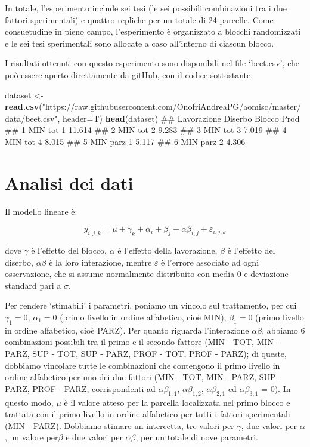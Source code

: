 \documentclass[a4paper,12pt,oneside]{book}
\newenvironment{Shaded}{\begin{snugshade}}{\end{snugshade}}
\newcommand{\KeywordTok}[1]{\textcolor[rgb]{0.13,0.29,0.53}{\textbf{#1}}}
\newcommand{\DataTypeTok}[1]{\textcolor[rgb]{0.13,0.29,0.53}{#1}}
\newcommand{\StringTok}[1]{\textcolor[rgb]{0.31,0.60,0.02}{#1}}
\newcommand{\NormalTok}[1]{#1}
\theoremstyle{definition}
\theoremstyle{definition}
\theoremstyle{definition}
\theoremstyle{remark}
\begin{document}
In totale, l'esperimento include sei tesi (le sei possibili combinazioni
tra i due fattori sperimentali) e quattro repliche per un totale di 24
parcelle. Come consuetudine in pieno campo, l'esperimento è organizzato
a blocchi randomizzati e le sei tesi sperimentali sono allocate a caso
all'interno di ciascun blocco.

I risultati ottenuti con questo esperimento sono disponibili nel file
`beet.csv', che può essere aperto direttamente da gitHub, con il codice
sottostante.

\begin{Shaded}
\begin{Highlighting}[]
\NormalTok{dataset <-}\StringTok{ }\KeywordTok{read.csv}\NormalTok{(}\StringTok{"https://raw.githubusercontent.com/OnofriAndreaPG/aomisc/master/data/beet.csv"}\NormalTok{, }\DataTypeTok{header=}\NormalTok{T)}
\KeywordTok{head}\NormalTok{(dataset)}
\NormalTok{##   Lavorazione Diserbo Blocco   Prod}
\NormalTok{## 1         MIN     tot      1 11.614}
\NormalTok{## 2         MIN     tot      2  9.283}
\NormalTok{## 3         MIN     tot      3  7.019}
\NormalTok{## 4         MIN     tot      4  8.015}
\NormalTok{## 5         MIN    parz      1  5.117}
\NormalTok{## 6         MIN    parz      2  4.306}
\end{Highlighting}
\end{Shaded}

\section{Analisi dei dati}\label{analisi-dei-dati-1}

Il modello lineare è:

\[y_{i,j,k} = \mu + \gamma_k + \alpha_i + \beta_j + \alpha\beta_{i,j} + \varepsilon_{i,j,k}\]

dove \(\gamma\) è l'effetto del blocco, \(\alpha\) è l'effetto della
lavorazione, \(\beta\) è l'effetto del diserbo, \(\alpha\beta\) è la
loro interazione, mentre \(\varepsilon\) è l'errore associato ad ogni
osservazione, che si assume normalmente distribuito con media 0 e
deviazione standard pari a \(\sigma\).

Per rendere `stimabili' i parametri, poniamo un vincolo sul trattamento,
per cui \(\gamma_1 = 0\), \(\alpha_1 = 0\) (primo livello in ordine
alfabetico, cioè MIN), \(\beta_1 = 0\) (primo livello in ordine
alfabetico, cioè PARZ). Per quanto riguarda l'interazione
\(\alpha\beta\), abbiamo 6 combinazioni possibili tra il primo e il
secondo fattore (MIN - TOT, MIN - PARZ, SUP - TOT, SUP - PARZ, PROF -
TOT, PROF - PARZ); di queste, dobbiamo vincolare tutte le combinazioni
che contengono il primo livello in ordine alfabetico per uno dei due
fattori (MIN - TOT, MIN - PARZ, SUP - PARZ, PROF - PARZ, corrispondenti
ad \(\alpha\beta_{1,1}\), \(\alpha\beta_{1,2}\), \(\alpha\beta_{2,1}\)
ed \(\alpha\beta_{3,1}\) = 0). In questo modo, \(\mu\) è il valore
atteso per la parcella localizzata nel primo blocco e trattata con il
primo livello in ordine alfabetico per tutti i fattori sperimentali (MIN
- PARZ). Dobbiamo stimare un intercetta, tre valori per \(\gamma\), due
valori per \(\alpha\), un valore per\(\beta\) e due valori per
\(\alpha\beta\), per un totale di nove parametri.
\end{document}
